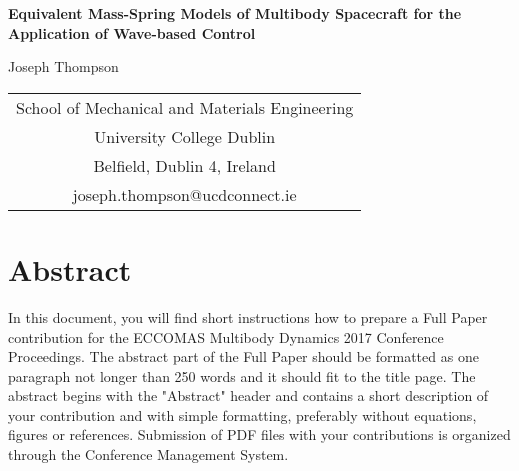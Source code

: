 \documentclass{mbd_fullpaper}
\begin{document}
\newcommand{\heading}[1]{
   {\medskip\hskip5em\bf\large{#1}
   \vskip0.5ex
   }
}
\newcommand{\eqnref}[1]{
  (\ref{#1})
}

\renewcommand{\refname}{\medskip\bf\large References}



\begin{center}
  \Large{\bf
Equivalent Mass-Spring Models of Multibody Spacecraft for the Application of Wave-based Control  }
\end{center}

\begin{center}
\large{
Joseph Thompson
}
\end{center}

{
\begin{center}
 \small
  \begin{tabular}{c}
    School of Mechanical and Materials Engineering \\
    University College Dublin              \\
    Belfield, Dublin 4, Ireland        \\
    joseph.thompson@ucdconnect.ie                        \\
  \end{tabular}
\end{center}
}


\section*{Abstract}

In this document, you will find short instructions how to prepare a Full Paper contribution for the ECCOMAS Multibody Dynamics 2017 Conference Proceedings. The abstract part of the Full Paper should be formatted as one paragraph not longer than 250 words and it should fit to the title page. The abstract begins with the "Abstract" header and contains a short description of your contribution and with simple formatting, preferably without equations, figures or references. Submission of PDF files with your contributions is organized through the Conference Management System.


\end{document}

